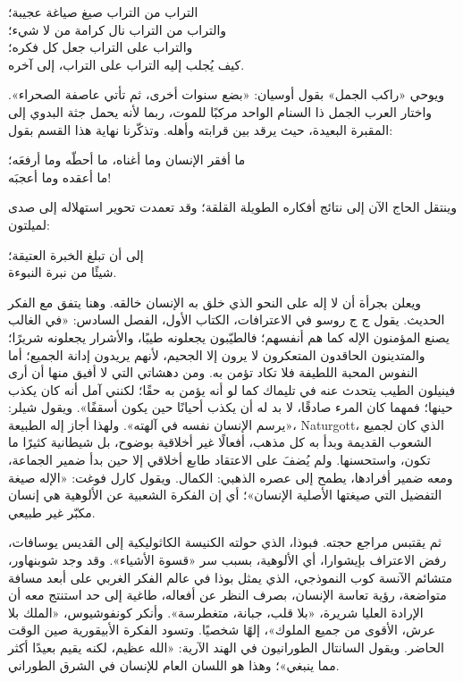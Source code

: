 \begin{SourceQuotation}
التراب من التراب صيغ صياغة عجيبة؛\\
والتراب من التراب نال كرامة من لا شيء؛\\
والتراب على التراب جعل كل فكره؛\\
كيف يُجلب إليه التراب على التراب، إلى آخره.
\end{SourceQuotation}

ويوحي «راكب الجمل» بقول أوسيان: «بضع سنوات أخرى، ثم تأتي عاصفة الصحراء». واختار العرب الجمل ذا السنام الواحد مركبًا للموت، ربما لأنه يحمل جثة البدوي إلى المقبرة البعيدة، حيث يرقد بين قرابته وأهله. وتذكّرنا نهاية هذا القسم بقول:

\begin{SourceQuotation}
ما أفقر الإنسان وما أغناه، ما أحطّه وما أرفعَه؛\\
ما أعقده وما أعجبَه!
\end{SourceQuotation}

وينتقل الحاج الآن إلى نتائج أفكاره الطويلة القلقة؛ وقد تعمدت تحوير استهلاله إلى صدى لميلتون:

\begin{SourceQuotation}
إلى أن تبلغ الخبرة العتيقة؛\\
شيئًا من نبرة النبوءة.
\end{SourceQuotation}

ويعلن بجرأة أن لا إله على النحو الذي خلق به الإنسان خالقه. وهنا يتفق مع الفكر الحديث. يقول ج ج روسو في الاعترافات، الكتاب الأول، الفصل السادس: «في الغالب يصنع المؤمنون الإله كما هم أنفسهم؛ فالطيّبون يجعلونه طيبًا، والأشرار يجعلونه شريرًا؛ والمتدينون الحاقدون المتعكرون لا يرون إلا الجحيم، لأنهم يريدون إدانة الجميع؛ أما النفوس المحبة اللطيفة فلا تكاد تؤمن به. ومن دهشاتي التي لا أفيق منها أن أرى فينيلون الطيب يتحدث عنه في تليماك كما لو أنه يؤمن به حقًا؛ لكنني آمل أنه كان يكذب حينها؛ فمهما كان المرء صادقًا، لا بد له أن يكذب أحيانًا حين يكون أسقفًا». ويقول شيلر: «يرسم الإنسان نفسه في آلهته». ولهذا أجاز إله الطبيعة، \textenglish{Naturgott}، الذي كان لجميع الشعوب القديمة وبدأ به كل مذهب، أفعالًا غير أخلاقية بوضوح، بل شيطانية كثيرًا ما تكون، واستحسنها. ولم يُضفَ على الاعتقاد طابع أخلاقي إلا حين بدأ ضمير الجماعة، ومعه ضمير أفرادها، يطمح إلى عصره الذهبي: الكمال. ويقول كارل فوغت: «الإله صيغة التفضيل التي صيغتها الأصلية الإنسان»؛ أي إن الفكرة الشعبية عن الألوهية هي إنسان مكبّر غير طبيعي.

ثم يقتبس مراجع حجته. فبوذا، الذي حولته الكنيسة الكاثوليكية إلى القديس يوسافات، رفض الاعتراف بإيشوارا، أي الألوهية، بسبب سر «قسوة الأشياء». وقد وجد شوبنهاور، متشائم الآنسة كوب النموذجي، الذي يمثل بوذا في عالم الفكر الغربي على أبعد مسافة متواضعة، رؤية تعاسة الإنسان، بصرف النظر عن أفعاله، طاغية إلى حد استنتج معه أن الإرادة العليا شريرة، «بلا قلب، جبانة، متغطرسة». وأنكر كونفوشيوس، «الملك بلا عرش، الأقوى من جميع الملوك»، إلهًا شخصيًا. وتسود الفكرة الأبيقورية صين الوقت الحاضر. ويقول السانتال الطورانيون في الهند الآرية: «الله عظيم، لكنه يقيم بعيدًا أكثر مما ينبغي»؛ وهذا هو اللسان العام للإنسان في الشرق الطوراني.

